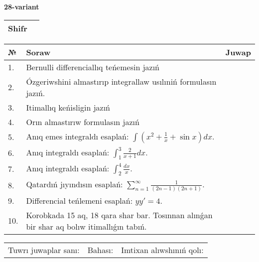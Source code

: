 \documentclass{article}
\begin{document}
  \egroup
  
  \newpage
  
  
  \textbf{28-variant}\\
  
  \bgroup
  \def\arraystretch{1.6} %
  
  \begin{tabular}{|m{5.7cm}|m{9.5cm}|}
  \hline
  Shifr & \\
  \hline
  \end{tabular}
  
  \vspace{1cm}
  
  \begin{tabular}{|m{0.7cm}|m{10cm}|m{4cm}|}
  \hline
  № & Soraw & Juwap \\
  \hline
  1. & Bernulli differenciallıq teńemesin jazıń &  \\
  \hline
  2. & Ózgeriwshini almastırıp integrallaw usılıniń formulasın jazıń. &  \\
  \hline
  3. & Itimallıq keńisligin jazıń &  \\
  \hline
  4. & Orın almastırıw formulasın jazıń &  \\
  \hline
  5. & Anıq emes integraldı esaplań: \(\int{\left( x^2  + \frac{1}{x} + \sin x \right)dx}\). &  \\
  \hline
  6. & Anıq integraldı esaplań: \(\int_{1}^{3}\frac{2}{x + 1}dx\). &  \\
  \hline
  7. & Anıq integraldı esaplań: \(\int_{2}^{4}\frac{dx}{x}\). &  \\
  \hline
  8. & Qatardıń jıyındısın esaplań: \(\sum_{n = 1}^{\infty}\frac{1}{(2n - 1)(2n + 1)}\). &  \\
  \hline
  9. & Differencial teńlemeni esaplań: \(yy' = 4\). &  \\
  \hline
  10. & Korobkada 15 aq, 18 qara shar bar. Tosınnan alınǵan bir shar aq bolıw itimallıǵın tabıń. &  \\
  \hline
  \end{tabular}
  
  \vspace{1cm}
  
  \begin{tabular}{lll}
  Tuwrı juwaplar sanı: \underline{\hspace{1.5cm}} & 
  Bahası: \underline{\hspace{1.5cm}} & 
  Imtixan alıwshınıń qolı: \underline{\hspace{2cm}} \\
  \end{tabular}
  
\end{document}
